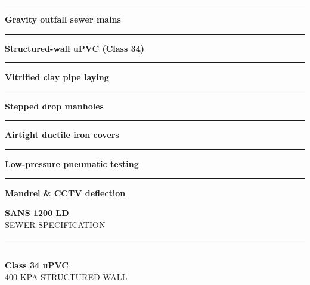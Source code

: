 \documentclass[a4paper,11pt]{article}
\begin{document}
\begin{minipage}[t]{0.34\textwidth}
    \vspace{0pt}
    \begin{tcolorbox}[
        enhanced, colback=mhoffwhite, colframe=mhnavy, boxrule=1pt, arc=4pt,
        title={\bfseries\color{white}\faWater\ Sewer Scope of Work},
        colbacktitle=mhnavy, left=7pt, right=7pt, top=6pt, bottom=6pt,
        drop shadow=black!6
    ]
        \fontsize{8.1pt}{11.6pt}\selectfont
        \textcolor{mhnavy}{\rule{4pt}{4pt}}\hspace{4pt}\textbf{Gravity outfall sewer mains}\\
        \textcolor{mhnavy}{\rule{4pt}{4pt}}\hspace{4pt}\textbf{Structured-wall uPVC (Class 34)}\\
        \textcolor{mhnavy}{\rule{4pt}{4pt}}\hspace{4pt}\textbf{Vitrified clay pipe laying}\\
        \textcolor{mhnavy}{\rule{4pt}{4pt}}\hspace{4pt}\textbf{Stepped drop manholes}\\
        \textcolor{mhnavy}{\rule{4pt}{4pt}}\hspace{4pt}\textbf{Airtight ductile iron covers}\\
        \textcolor{mhnavy}{\rule{4pt}{4pt}}\hspace{4pt}\textbf{Low-pressure pneumatic testing}\\
        \textcolor{mhnavy}{\rule{4pt}{4pt}}\hspace{4pt}\textbf{Mandrel \& CCTV deflection}
    \end{tcolorbox}

    \vspace{0.20cm}

    \begin{tcolorbox}[
        enhanced, colback=white, colframe=mhlightgray, boxrule=0.8pt, arc=4pt,
        left=6pt, right=6pt, top=6pt, bottom=6pt, halign=center,
        drop shadow=black!4
    ]
        {\fontsize{18pt}{20pt}\selectfont\bfseries\color{mhblue}SANS 1200 LD}\\[1pt]
        {\fontsize{7.4pt}{9pt}\selectfont\color{mhtextmuted}\MakeUppercase{Sewer Specification}}\\[4pt]
        \textcolor{mhlightgray}{\rule{3.2cm}{0.6pt}}\\[4pt]
        {\fontsize{13pt}{15pt}\selectfont\bfseries\color{mhnavy}Class 34 uPVC}\\[1pt]
        {\fontsize{7.2pt}{9pt}\selectfont\color{mhtextmuted}\MakeUppercase{400 kPa Structured Wall}}
    \end{tcolorbox}
\end{minipage}
\end{document}
